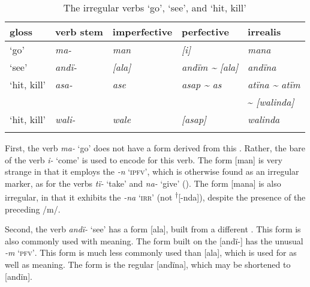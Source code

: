   \begin{table}
 \caption{\label{tab:4.7} The irregular verbs ‘go’, ‘see’, and ‘hit, kill’}
\begin{tabularx}{\textwidth}{lllll}
\lsptoprule
gloss & verb stem & imperfective & perfective & irrealis\\
\midrule
‘go’ & {\itshape ma-} & {\itshape man} & {\itshape [i]} & {\itshape mana}\\
‘see’ & {\itshape andï-} & {\itshape [ala]} & {\itshape andïm \textup{{\textasciitilde}} [ala]} & {\itshape andïna}\\
‘hit, kill’ & {\itshape asa-} & {\itshape ase} & {\itshape asap {\textasciitilde} as} & {\itshape atïna \textup{{\textasciitilde}} atïm} \\ & & & &{\textup{{\textasciitilde}} \textit{[walinda]}}\\
‘hit, kill’ & {\itshape wali-} & {\itshape wale} & {\itshape [asap]} & {\itshape walinda}\\
\lspbottomrule
\end{tabularx}
\end{table}



First, the verb \textit{ma-} ‘go’ does not have a  form derived from this . Rather, the bare  of the verb \textit{i-} ‘come’ is used to encode   for this verb. The  form [man] is very strange in that it employs the  \textit{-n} \textsc{‘ipfv’}, which is otherwise found as an irregular  marker, as for the verbs \textit{tï-} ‘take’ and \textit{na-} ‘give’ (). The  form [mana] is also irregular, in that it exhibits the  \textit{-na} \textsc{‘irr’} (not \textsuperscript{†}[-nda]), despite the presence of the preceding   /m/.

  Second, the verb \textit{andï-} ‘see’ has a   form [ala], built from a different . This form is also commonly used with  meaning. The  form built on the  [andï-] has the unusual  \textit{-m} \textsc{‘pfv’}. This form is much less commonly used than [ala], which is used for  as well as  meaning. The  form is the regular [andïna], which may be shortened to [andïn].

